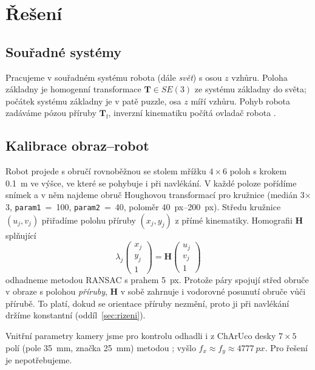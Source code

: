 \documentclass[11pt,a4paper]{article}
\newcommand{\T}{\mathbf{T}}
\begin{document}
\section{Řešení}
\label{sec:reseni}

\subsection{Souřadné systémy}
Pracujeme v souřadném systému robota (dále \emph{svět}) s osou $z$ vzhůru.
Poloha základny je homogenní transformace $\T \in SE(3)$ ze systému základny
do světa; počátek systému základny je v patě puzzle, osa $z$ míří vzhůru.
Pohyb robota zadáváme pózou příruby $\T_\mathrm{f}$, inverzní kinematiku
počítá ovladač robota \cite{stations}.

\subsection{Kalibrace obraz--robot}
\label{sec:kalibrace}

Robot projede s obručí rovnoběžnou se stolem mřížku $4\times6$ poloh s krokem
\SI{0,1}{m} ve výšce, ve které se pohybuje i při navlékání. V každé poloze
pořídíme snímek a v něm najdeme obruč Houghovou transformací pro kružnice
\cite{duda1972,opencv} (medián \num{3}$\times$\num{3}, \texttt{param1}~=~100,
\texttt{param2}~=~40, poloměr \SIrange{40}{200}{px}). Středu kružnice
$(u_j,v_j)$ přiřadíme polohu příruby $(x_j,y_j)$ z přímé kinematiky. Homografii
$\mathbf{H}$ \cite{hartley2004} splňující
\begin{equation}
  \lambda_j \begin{pmatrix} x_j \\ y_j \\ 1 \end{pmatrix}
  = \mathbf{H} \begin{pmatrix} u_j \\ v_j \\ 1 \end{pmatrix}
  \label{eq:homography}
\end{equation}
odhadneme metodou RANSAC s prahem \SI{5}{px}. Protože páry spojují střed obruče
v obraze s polohou \emph{příruby}, $\mathbf{H}$ v sobě zahrnuje i vodorovné
posunutí obruče vůči přírubě. To platí, dokud se orientace příruby nezmění,
proto ji při navlékání držíme konstantní (oddíl~\ref{sec:rizeni}).

Vnitřní parametry kamery jsme pro kontrolu odhadli i z ChArUco desky
$7\times5$ polí (pole \SI{35}{mm}, značka \SI{25}{mm}) metodou \cite{zhang2000};
vyšlo $f_x \approx f_y \approx \SI{4777}{px}$. Pro řešení je nepotřebujeme.
\end{document}
